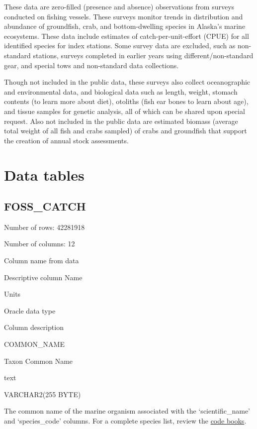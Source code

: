 \documentclass[
  letterpaper,
  oneside,
  open=any]{scrbook}
\begin{document}
These data are zero-filled (presence and absence) observations from
surveys conducted on fishing vessels. These surveys monitor trends in
distribution and abundance of groundfish, crab, and bottom-dwelling
species in Alaska's marine ecosystems. These data include estimates of
catch-per-unit-effort (CPUE) for all identified species for index
stations. Some survey data are excluded, such as non-standard stations,
surveys completed in earlier years using different/non-standard gear,
and special tows and non-standard data collections.

Though not included in the public data, these surveys also collect
oceanographic and environmental data, and biological data such as
length, weight, stomach contents (to learn more about diet), otoliths
(fish ear bones to learn about age), and tissue samples for genetic
analysis, all of which can be shared upon special request. Also not
included in the public data are estimated biomass (average total weight
of all fish and crabs sampled) of crabs and groundfish that support the
creation of annual stock assessments.

\hypertarget{data-tables-2}{%
\section{Data tables}\label{data-tables-2}}

\hypertarget{foss_catch}{%
\subsection{FOSS\_CATCH}\label{foss_catch}}

Number of rows: 42281918

Number of columns: 12

Column name from data

Descriptive column Name

Units

Oracle data type

Column description

COMMON\_NAME

Taxon Common Name

text

VARCHAR2(255 BYTE)

The common name of the marine organism associated with the
`scientific\_name' and `species\_code' columns. For a complete species
list, review the
\href{https://www.fisheries.noaa.gov/resource/document/groundfish-survey-species-code-manual-and-data-codes-manual}{code
books}.
\end{document}
